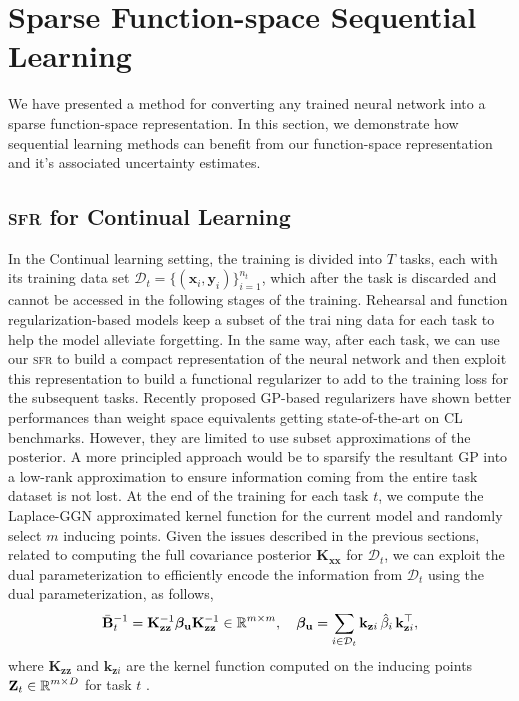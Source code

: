 \documentclass{article}
\newcommand{\our}{\textsc{sfr}\xspace}
\newcommand{\dataset}{\ensuremath{\mathcal{D}}}
\newcommand{\mathbold}[1]{\bm{#1}}
\newcommand{\mbf}[1]{\mathbf{#1}}
\newcommand{\MB}{\mbf{B}}
\newcommand{\MZ}{\mbf{Z}}
\newcommand{\MX}{\mbf{X}}
\newcommand{\T}{\top}
\newcommand{\vbeta}[0]{\mathbold{\beta}}
\newcommand{\vu}{\mbf{u}}
\newcommand{\MKzz}{\mbf{K}_{\mbf{z}\mbf{z}}}
\newcommand{\MKxx}{\mbf{K}_{\mbf{x}\mbf{x}}}
\newcommand{\vkzi}{\mbf{k}_{\mbf{z}i}}
\begin{document}
\section{Sparse Function-space Sequential Learning}

We have presented a method for converting any trained neural network into a sparse function-space representation.
In this section, we demonstrate how sequential learning methods can benefit from our function-space representation and it's associated uncertainty estimates.



\subsection{\our for Continual Learning}
In the Continual learning setting, the training is divided into $T$ tasks, each with its training data set $\dataset_t = \{(\mathbf{x}_{i}, \mathbf{y}_{i})\}_{i=1}^{n_t}$, which after the task is discarded and cannot be accessed in the following stages of the training. Rehearsal and function regularization-based models keep a subset of the trai ning data for each task to help the model alleviate forgetting. In the same way, after each task, we can use our \our to build a compact representation of the neural network and then exploit this representation to build a functional regularizer to add to the training loss for the subsequent tasks. Recently proposed GP-based regularizers \cite{ pan2020continual, rudner2022continual} have shown better performances than weight space equivalents getting state-of-the-art on CL benchmarks. However, they are limited to use subset approximations of the posterior.
A more principled approach would be to sparsify the resultant GP into a low-rank approximation to ensure information coming from the entire task dataset is not lost. %
At the end of the training for each task $t$, we compute the Laplace-GGN approximated kernel function for the current model and randomly select $m$ inducing points. Given the issues described in the previous sections, related to computing the full covariance posterior $\MKxx$ for $\dataset_t$,\todo{this should be $\kappa(\MX_t, \MX_t)$} we can exploit the dual parameterization to efficiently encode the information from  $\dataset_t$ using the dual parameterization, as follows, 
\begin{equation}
 	\bar{\MB}^{-1}_t = \MKzz^{-1} \vbeta_\vu \MKzz^{-1} \in \R^{m \times m}, 
 	\quad 
 	\vbeta_{\vu} =  \sum_{i \in \dataset_t} \vkzi \,\hat{\beta}_{i} \, \vkzi^{\T} ,    
 \end{equation}
 where $\MKzz$ and $\vkzi$ are the kernel function computed on the inducing points $\MZ_t \in \R^{m \times D}$ for task $t$ .
  
\end{document}
